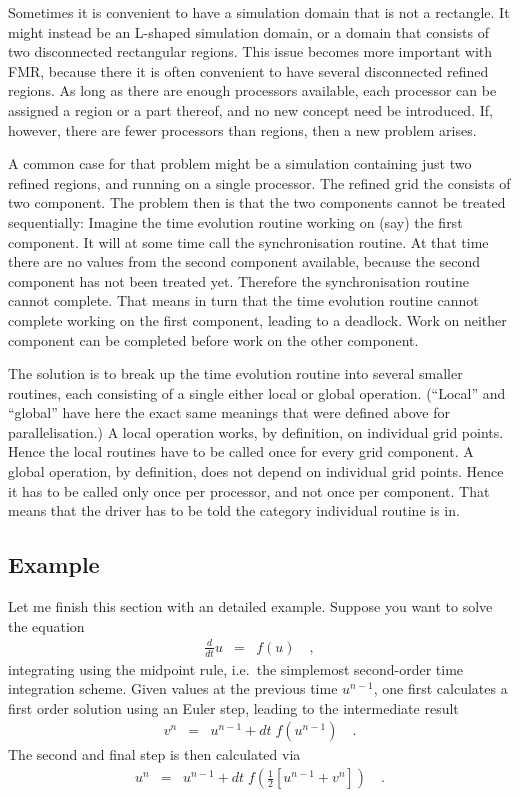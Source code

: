 Sometimes it is convenient to have a simulation domain that is not a
rectangle.  It might instead be an L-shaped simulation domain, or a
domain that consists of two disconnected rectangular regions.  This
issue becomes more important with FMR, because there it is often
convenient to have several disconnected refined regions.  As long as
there are enough processors available, each processor can be assigned
a region or a part thereof, and no new concept need be introduced.
If, however, there are fewer processors than regions, then a new
problem arises.

A common case for that problem might be a simulation containing just
two refined regions, and running on a single processor.  The refined
grid the consists of two component.  The problem then is that the two
components cannot be treated sequentially: Imagine the time evolution
routine working on (say) the first component.  It will at some time
call the synchronisation routine.  At that time there are no values
from the second component available, because the second component has
not been treated yet.  Therefore the synchronisation routine cannot
complete.  That means in turn that the time evolution routine cannot
complete working on the first component, leading to a deadlock.  Work
on neither component can be completed before work on the other
component.

The solution is to break up the time evolution routine into several
smaller routines, each consisting of a single either local or global
operation.  (``Local'' and ``global'' have here the exact same
meanings that were defined above for parallelisation.)  A local
operation works, by definition, on individual grid points.  Hence the
local routines have to be called once for every grid component.  A
global operation, by definition, does not depend on individual grid
points.  Hence it has to be called only once per processor, and not
once per component.  That means that the driver has to be told the
category individual routine is in.

\subsection{Example}

Let me finish this section with an detailed example.  Suppose you want
to solve the equation
\begin{eqnarray}
   \frac{d}{dt} u & = & f(u) \quad ,
\end{eqnarray}
integrating using the midpoint rule, i.e.\ the simplemost second-order
time integration scheme.  Given values at the previous time $u^{n-1}$,
one first calculates a first order solution using an Euler step,
leading to the intermediate result
\begin{eqnarray}
   v^n & = & u^{n-1} + dt\; f(u^{n-1}) \quad .
\end{eqnarray}
The second and final step is then calculated via
\begin{eqnarray}  
   u^n & = & u^{n-1} + dt\; f(\frac{1}{2} [u^{n-1} + v^n]) \quad .
\end{eqnarray}

